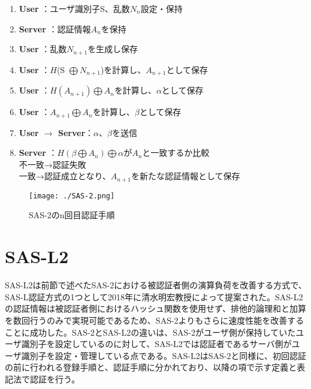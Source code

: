 \documentclass{thesis}
\begin{document}
\begin{enumerate}
\item \textbf{User} \hspace{49pt}：ユーザ識別子S、乱数$N_n$設定・保持
\item \textbf{Server} \hspace{41pt}：認証情報$A_n$を保持
\item \textbf{User} \hspace{50pt}：乱数$N_{n+1}$を生成し保存
\item \textbf{User} \hspace{50pt}：$H$(S $\bigoplus N_{n+1}$)を計算し、$A_{n+1}$として保存
\item \textbf{User} \hspace{50pt}：$H(A_{n+1}) \bigoplus A_n$を計算し、$\alpha$として保存
\item \textbf{User} \hspace{50pt}：$A_{n+1} \bigoplus A_n$を計算し、$\beta$として保存
\item \textbf{User $\rightarrow$ Server}：$\alpha、 \beta$を送信
\item \textbf{Server} \hspace{42pt}：$H(\beta \bigoplus A_n) \bigoplus \alpha$が$A_n$と一致するか比較 \\
\hspace{92pt}不一致→認証失敗 \\ 
\hspace{92pt}一致→認証成立となり、$A_{n+1}$を新たな認証情報として保存
\end{enumerate}

\begin{figure}[H]
 \center
 \texttt{[image: ./SAS-2.png]}
 \caption{SAS-2のn回目認証手順}
\end{figure}

\section{SAS-L2}
SAS-L2\cite{eight}は前節で述べたSAS-2における被認証者側の演算負荷を改善する方式で、SAS-L認証方式\cite{nine}の1つとして2018年に清水明宏教授によって提案された。SAS-L2の認証情報は被認証者側におけるハッシュ関数を使用せず、排他的論理和と加算を数回行うのみで実現可能であるため、SAS-2よりもさらに速度性能を改善することに成功した。SAS-2とSAS-L2の違いは、SAS-2がユーザ側が保持していたユーザ識別子を設定しているのに対して、SAS-L2では認証者であるサーバ側がユーザ識別子を設定・管理している点である。SAS-L2はSAS-2と同様に、初回認証の前に行われる登録手順と、認証手順に分かれており、以降の項で示す定義と表記法で認証を行う。
\end{document}
